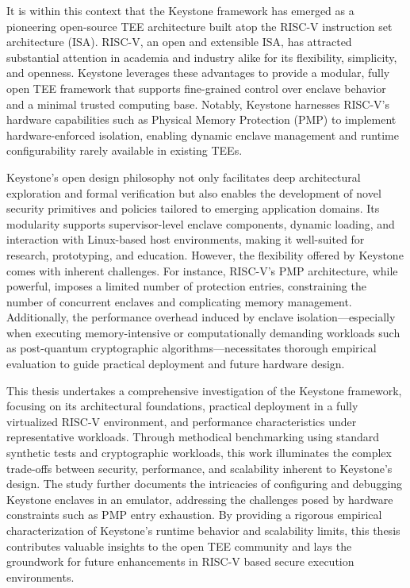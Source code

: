 It is within this context that the Keystone framework has emerged as a pioneering open-source TEE architecture built atop the RISC-V instruction set architecture (ISA). RISC-V, an open and extensible ISA, has attracted substantial attention in academia and industry alike for its flexibility, simplicity, and openness. Keystone leverages these advantages to provide a modular, fully open TEE framework that supports fine-grained control over enclave behavior and a minimal trusted computing base. Notably, Keystone harnesses RISC-V’s hardware capabilities such as Physical Memory Protection (PMP) to implement hardware-enforced isolation, enabling dynamic enclave management and runtime configurability rarely available in existing TEEs.

Keystone’s open design philosophy not only facilitates deep architectural exploration and formal verification but also enables the development of novel security primitives and policies tailored to emerging application domains. Its modularity supports supervisor-level enclave components, dynamic loading, and interaction with Linux-based host environments, making it well-suited for research, prototyping, and education. However, the flexibility offered by Keystone comes with inherent challenges. For instance, RISC-V’s PMP architecture, while powerful, imposes a limited number of protection entries, constraining the number of concurrent enclaves and complicating memory management. Additionally, the performance overhead induced by enclave isolation—especially when executing memory-intensive or computationally demanding workloads such as post-quantum cryptographic algorithms—necessitates thorough empirical evaluation to guide practical deployment and future hardware design.

This thesis undertakes a comprehensive investigation of the Keystone framework, focusing on its architectural foundations, practical deployment in a fully virtualized RISC-V environment, and performance characteristics under representative workloads. Through methodical benchmarking using standard synthetic tests and cryptographic workloads, this work illuminates the complex trade-offs between security, performance, and scalability inherent to Keystone’s design. The study further documents the intricacies of configuring and debugging Keystone enclaves in an emulator, addressing the challenges posed by hardware constraints such as PMP entry exhaustion. By providing a rigorous empirical characterization of Keystone’s runtime behavior and scalability limits, this thesis contributes valuable insights to the open TEE community and lays the groundwork for future enhancements in RISC-V based secure execution environments.

